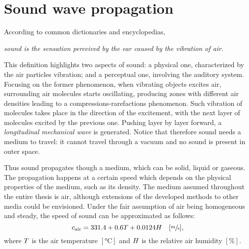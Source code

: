 \section{Sound wave propagation}\label{ch:acoustics:sec:wave}%
According to common dictionaries and encyclopedias,
\begin{center}
    \textit{sound is the sensation perceived by the ear caused by the vibration of air}.
\end{center}
This definition highlights two aspects of sound: a physical one, characterized by the air particles vibration; and a perceptual one, involving the auditory system.
Focusing on the former phenomenon, when vibrating objects excites air, surrounding air molecules starts oscillating,
producing zones with different air densities leading to a compressions-rarefactions phenomenon.
Such vibration of molecules takes place in the direction of the excitement, with the next layer of molecules excited by the previous one.
Pushing layer by layer forward, a \textit{longitudinal mechanical wave} is generated.
Notice that therefore sound needs a medium to travel: it cannot travel through a vacuum and no sound is present in outer space.

Thus sound propagates though a medium, which can be solid, liquid or gaseous.
The propagation happens at a certain speed which depends on the physical properties of the medium, such as its density.
The medium assumed throughout the entire thesis is air, although extensions of the developed methods to other media could be envisioned.
Under the fair assumption of air being homogeneous and steady, the speed of sound can be approximated as follows:
\begin{equation}
    c_\text{air} =  331.4 + 0.6T + 0.0124H \hspace{1em} [\sfrac{\si{\metre}}{\si{\second}}]
    ,
\end{equation}
where $T$ is the air temperature $[\si{\celsius}]$ and $H$ is the relative air humidity $[\%]$.


